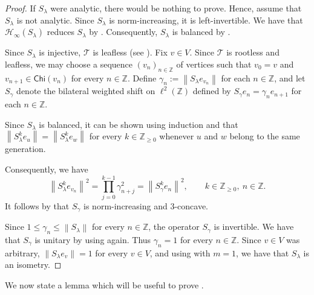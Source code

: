 \documentclass[11pt, reqno, a4paper]{amsart}
\theoremstyle{definition}
\newcommand{\calH}{{\mathcal{H}}}
\newcommand{\scrT}{{\mathscr T}}
\newcommand{\norm}[1]{\left\lVert #1 \right\rVert}
\renewcommand{\leq}{\leqslant}
\renewcommand{\geq}{\geqslant}
\newcommand{\Z}{\mathbb Z}
\newcommand{\Chi}{\mathsf{Chi}}
\numberwithin{equation}{section}
\begin{document}
\begin{proof}
    If $S_\lambda$ were analytic, there would be nothing to prove. Hence, assume that $S_\lambda$ is not analytic. Since $S_\lambda$ is norm-increasing, it is left-invertible. We have that $\calH_\infty(S_\lambda)$ reduces $S_\lambda$ by . Consequently, $S_\lambda$ is balanced by \cite[Theorem 4.1]{MR5052237}.
    
    Since $S_\lambda$ is injective, $\scrT$ is leafless (see \cite[Proposition 3.1.7]{MR2919910}). Fix $v\in V$. Since $\scrT$ is rootless and leafless, we may choose a sequence $(v_n)_{n\in\Z}$ of vertices such that $v_0=v$ and $v_{n+1}\in\Chi(v_n)$ for every $n\in\Z$. Define $\gamma_n:=\norm{S_\lambda e_{v_n}}$ for each $n\in\Z$, and let $S_\gamma$ denote the bilateral weighted shift on $\ell^2(\Z)$ defined by $S_\gamma e_n=\gamma_ne_{n+1}$ for each $n \in \Z$.

    Since $S_\lambda$ is balanced, it can be shown using induction and  that $\norm{S_\lambda^k e_u}=\norm{S_\lambda^k e_w}$ for every $k\in\Z_{\geq0}$ whenever $u$ and $w$ belong to the same generation.

    Consequently, we have
    \begin{equation*}
        \norm{S_\lambda ^k e_{v_n}}^2 =\prod_{j=0}^{k-1}\gamma_{n+j}^2 =\norm{S_\gamma^ke_n}^2, \qquad k\in\Z_{\geq0},\ n\in\Z.
    \end{equation*}
      It follows by  that $S_\gamma$ is norm-increasing and $3$-concave.

      Since $1\leq\gamma_n\leq\norm{S_\lambda}$ for every $n\in\Z$, the operator $S_\gamma$ is invertible. We have that $S_\gamma$ is unitary by using  again. Thus $\gamma_n=1$ for every $n\in\Z$. Since $v\in V$ was arbitrary, $\norm{S_\lambda e_v}=1$ for every $v\in V$, and using  with $m=1$, we have that $S_\lambda$ is an isometry.
\end{proof}

We now state a lemma which will be useful to prove . 
\end{document}
